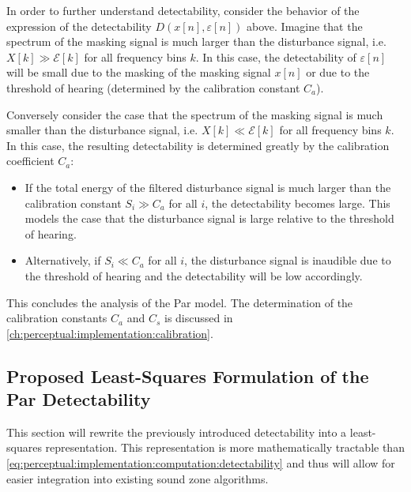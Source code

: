 In order to further understand detectability, consider the behavior of the expression of the detectability $D(x[n],\varepsilon[n])$ above.
Imagine that the spectrum of the masking signal is much larger than the disturbance signal, 
i.e. $X[k] \gg \mathcal{E}[k]$ for all frequency bins $k$.
In this case, the detectability of $\varepsilon[n]$ will be small due to the masking of the masking signal $x[n]$ or
due to the threshold of hearing (determined by the calibration constant $C_a$).

Conversely consider the case that the spectrum of the masking signal is much smaller than the disturbance signal,
i.e. $X[k] \ll \mathcal{E}[k]$ for all frequency bins $k$.
In this case, the resulting detectability is determined greatly by the calibration coefficient $C_a$: 
\begin{itemize}
    \item If the total energy of the filtered disturbance signal is much larger than the calibration constant 
$S_i \gg C_a$ for all $i$, the detectability becomes large.
This models the case that the disturbance signal is large relative to the threshold of hearing.
    \item Alternatively, if $S_i \ll C_a$ for all $i$, the disturbance signal is inaudible due to the threshold of hearing and 
the detectability will be low accordingly.
\end{itemize}

This concludes the analysis of the Par model.
The determination of the calibration constants $C_a$ and $C_s$ is discussed in \autoref{ch:perceptual:implementation:calibration}.


\subsection{Proposed Least-Squares Formulation of the Par Detectability}
\label{ch:perceptual:implementation:least_squares}
This section will rewrite the previously introduced detectability into a least-squares representation. 
This representation is more mathematically tractable than \autoref{eq:perceptual:implementation:computation:detectability} and thus 
will allow for easier integration into existing sound zone algorithms.

